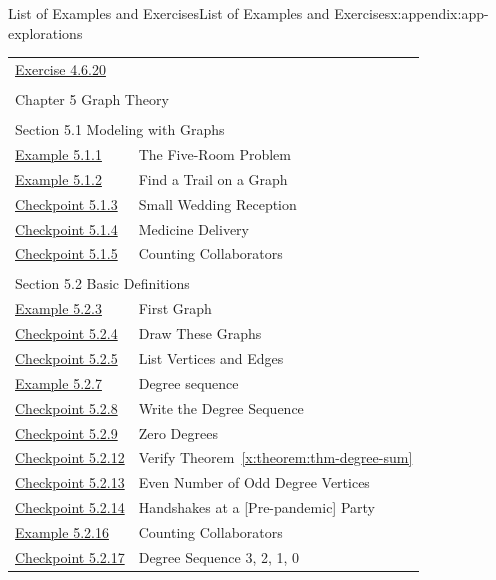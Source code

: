 \documentclass[oneside,10pt,]{book}
\newcommand{\xreffont}{\relax}
\numberwithin{equation}{section}
\begin{document}
\begin{appendixptx}{List of Examples and Exercises}{}{List of Examples and Exercises}{}{}{x:appendix:app-explorations}
\begin{longtable}[l]{ll}
\hyperlink{g:exercise:id539476}{Exercise 4.6.20}& \\
\multicolumn{2}{l}{\null}\\[1.5ex] \multicolumn{2}{l}{\large Chapter 5 Graph Theory}\\[0.5ex]
\multicolumn{2}{l}{\null}\\[1.5ex] \multicolumn{2}{l}{\large Section 5.1 Modeling with Graphs}\\[0.5ex]
\hyperref[x:example:eg-graph-model-room]{Example 5.1.1}& The Five-Room Problem\\
\hyperref[x:example:eg-graph-model-eulerian]{Example 5.1.2}& Find a Trail on a Graph\\
\hyperref[x:exercise:ex-graph-g8]{Checkpoint 5.1.3}& Small Wedding Reception\\
\hyperref[x:exercise:ex-graph-herbs]{Checkpoint 5.1.4}& Medicine Delivery\\
\hyperref[x:exercise:ex-graph-coauthors]{Checkpoint 5.1.5}& Counting Collaborators\\
\multicolumn{2}{l}{\null}\\[1.5ex] \multicolumn{2}{l}{\large Section 5.2 Basic Definitions}\\[0.5ex]
\hyperref[x:example:eg-graph-first]{Example 5.2.3}& First Graph\\
\hyperref[x:exercise:ex-graph-first-draw]{Checkpoint 5.2.4}& Draw These Graphs\\
\hyperref[x:exercise:ex-graph-first-list]{Checkpoint 5.2.5}& List Vertices and Edges\\
\hyperref[x:example:eg-graph-degree]{Example 5.2.7}& Degree sequence\\
\hyperref[x:exercise:ex-graph-degree]{Checkpoint 5.2.8}& Write the Degree Sequence\\
\hyperref[x:exercise:ex-graph-degree-zero]{Checkpoint 5.2.9}& Zero Degrees\\
\hyperref[x:exercise:ex-graph-degsum]{Checkpoint 5.2.12}& Verify Theorem~{\xreffont\ref*{x:theorem:thm-degree-sum}}\\
\hyperref[x:exercise:ex-graph-handshake]{Checkpoint 5.2.13}& Even Number of Odd Degree Vertices\\
\hyperref[x:exercise:ex-graph-handshake-lemma]{Checkpoint 5.2.14}& Handshakes at a [Pre-pandemic] Party\\
\hyperref[x:example:eg-graph-coauthors-answer]{Example 5.2.16}& Counting Collaborators\\
\hyperref[x:exercise:ex-graph-degree-0-4]{Checkpoint 5.2.17}& Degree Sequence 3, 2, 1, 0\\

\end{longtable}
\end{appendixptx}
\end{document}
